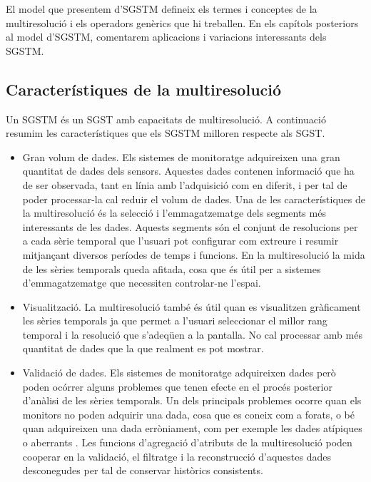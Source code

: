 El model que presentem d'\gls{SGSTM} defineix els termes i conceptes
de la multiresolució i els operadors genèrics que hi treballen. En els
capítols posteriors al model d'\gls{SGSTM}, comentarem aplicacions i variacions interessants dels \gls{SGSTM}.






\subsection{Característiques de la multiresolució}

Un \gls{SGSTM} és un \gls{SGST} amb capacitats de multiresolució.  A
continuació resumim les característiques que els \gls{SGSTM} milloren
respecte als \gls{SGST}.

\begin{itemize}

\item Gran volum de dades. Els sistemes de monitoratge adquireixen una
  gran quantitat de dades dels sensors. Aquestes dades contenen
  informació que ha de ser observada, tant en línia amb l'adquisició
  com en diferit, i per tal de poder processar-la cal reduir el volum
  de dades. Una de les característiques de la multiresolució és la
  selecció i l'emmagatzematge dels segments més interessants de les
  dades. Aquests segments són el conjunt de resolucions per a cada
  sèrie temporal que l'usuari pot configurar com extreure i resumir
  mitjançant diversos períodes de temps i funcions. En la
  multiresolució la mida de les sèries temporals queda afitada, cosa
  que és útil per a sistemes d'emmagatzematge que necessiten
  controlar-ne l'espai.


\item Visualització. La multiresolució també és útil quan es
  visualitzen gràficament les sèries temporals ja que permet a
  l'usuari seleccionar el millor rang temporal i la resolució que
  s'adeqüen a la pantalla. No cal processar amb més quantitat de dades que
  la que realment es pot mostrar.


\item Validació de dades. Els sistemes de monitoratge adquireixen
  dades però poden ocórrer alguns problemes que tenen efecte en el
  procés posterior d'anàlisi de les sèries temporals. Un dels
  principals problemes ocorre quan els monitors no poden adquirir una
  dada, cosa que es coneix com a forats, o bé quan adquireixen una
  dada erròniament, com per exemple les dades atípiques o
  aberrants \parencite{quevedo10}.  Les funcions d'agregació
  d'atributs de la multiresolució poden cooperar en la validació, el
  filtratge i la reconstrucció d'aquestes dades desconegudes per tal
  de conservar històrics consistents.


\end{itemize}

